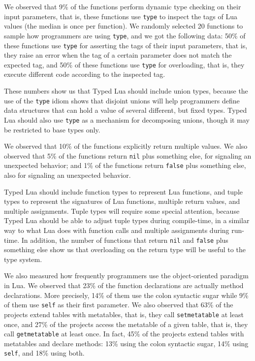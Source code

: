 We observed that 9\% of the functions perform dynamic type checking
on their input parameters, that is, these functions use \texttt{type}
to inspect the tags of Lua values (the median is once per function).
We randomly selected 20 functions to sample how programmers are
using \texttt{type}, and we got the following data:
50\% of these functions use \texttt{type} for asserting the tags of
their input parameters, that is, they raise an error when the tag of a
certain parameter does not match the expected tag, and
50\% of these functions use \texttt{type} for overloading, that is,
they execute different code according to the inspected tag.

These numbers show us that Typed Lua should include union types,
because the use of the \texttt{type} idiom shows that disjoint unions
will help programmers define data structures that can hold a value of
several different, but fixed types.
Typed Lua should also use \texttt{type} as a mechanism for decomposing
unions, though it may be restricted to base types only.

We observed that 10\% of the functions explicitly return multiple
values.
We also observed that 5\% of the functions return \texttt{nil} plus
something else, for signaling an unexpected behavior;
and 1\% of the functions return \texttt{false} plus something else,
also for signaling an unexpected behavior.

Typed Lua should include function types to represent Lua functions,
and tuple types to represent the signatures of Lua functions,
multiple return values, and multiple assignments.
Tuple types will require some special attention, because Typed Lua
should be able to adjust tuple types during compile-time, in a
similar way to what Lua does with function calls and multiple
assignments during run-time.
In addition, the number of functions that return \texttt{nil} and
\texttt{false} plus something else show us that overloading on the
return type will be useful to the type system.

We also measured how frequently programmers use the object-oriented
paradigm in Lua.
We observed that 23\% of the function declarations are actually
method declarations.
More precisely, 14\% of them use the colon syntactic sugar while
9\% of them use \texttt{self} as their first parameter.
We also observed that 63\% of the projects extend tables with
metatables, that is, they call \texttt{setmetatable} at least once,
and 27\% of the projects access the metatable of a given table,
that is, they call \texttt{getmetatable} at least once.
In fact, 45\% of the projects extend tables with metatables and
declare methods:
13\% using the colon syntactic sugar, 14\% using \texttt{self}, and
18\% using both.

